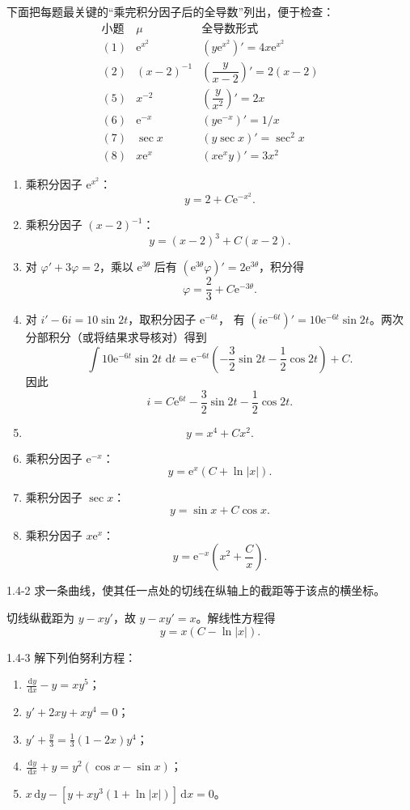 \documentclass[UTF8,a4paper,11pt]{ctexart}
\newcommand{\dd}{\,\mathrm d}
\newcommand{\e}{\mathrm e}
\begin{document}
\begin{solution}
下面把每题最关键的“乘完积分因子后的全导数”列出，便于检查：
\[
\begin{array}{c|c|c}
\text{小题}&\mu&\text{全导数形式}\\ \hline
(1)&\e^{x^2}&(y\e^{x^2})'=4x\e^{x^2}\\
(2)&(x-2)^{-1}&\left(\dfrac{y}{x-2}\right)'=2(x-2)\\
(5)&x^{-2}&\left(\dfrac{y}{x^2}\right)'=2x\\
(6)&\e^{-x}&(y\e^{-x})'=1/x\\
(7)&\sec x&(y\sec x)'=\sec^2x\\
(8)&x\e^x&(x\e^xy)'=3x^2
\end{array}
\]
\begin{enumerate}[label=(\arabic*)]
\item 乘积分因子 $\e^{x^2}$：
\[
\boxed{y=2+C\e^{-x^2}}.
\]
\item 乘积分因子 $(x-2)^{-1}$：
\[
\boxed{y=(x-2)^3+C(x-2)}.
\]
\item 对 $\varphi'+3\varphi=2$，乘以 $\e^{3\theta}$ 后有
$(\e^{3\theta}\varphi)'=2\e^{3\theta}$，积分得
\[
\boxed{\varphi=\frac23+C\e^{-3\theta}}.
\]
\item 对 $i'-6i=10\sin2t$，取积分因子 $\e^{-6t}$，
有 $(i\e^{-6t})'=10\e^{-6t}\sin2t$。两次分部积分（或将结果求导核对）得到
\[
\int 10\e^{-6t}\sin2t\,\dd t
=\e^{-6t}\left(-\frac32\sin2t-\frac12\cos2t\right)+C.
\]
因此
\[
\boxed{i=C\e^{6t}-\frac32\sin2t-\frac12\cos2t}.
\]
\item
\[
\boxed{y=x^4+Cx^2}.
\]
\item 乘积分因子 $\e^{-x}$：
\[
\boxed{y=\e^x(C+\ln|x|)}.
\]
\item 乘积分因子 $\sec x$：
\[
\boxed{y=\sin x+C\cos x}.
\]
\item 乘积分因子 $x\e^x$：
\[
\boxed{y=\e^{-x}\left(x^2+\frac Cx\right)}.
\]
\end{enumerate}
\end{solution}

\begin{problem}{1.4-2}
求一条曲线，使其任一点处的切线在纵轴上的截距等于该点的横坐标。
\end{problem}

\begin{solution}
切线纵截距为 $y-xy'$，故 $y-xy'=x$。解线性方程得
\[
\boxed{y=x(C-\ln|x|)}.
\]
\end{solution}

\begin{problem}{1.4-3}
解下列伯努利方程：
  \begin{enumerate}[label=(\arabic*)]
    \item $\displaystyle \frac{\dd y}{\dd x}-y=xy^5$；
    \item $\displaystyle y'+2xy+xy^4=0$；
    \item $\displaystyle y'+\frac y3=\frac13(1-2x)y^4$；
    \item $\displaystyle \frac{\dd y}{\dd x}+y=y^2(\cos x-\sin x)$；
    \item $\displaystyle x\dd y-[y+xy^3(1+\ln|x|)]\dd x=0$。
  \end{enumerate}
\end{problem}
\end{document}

